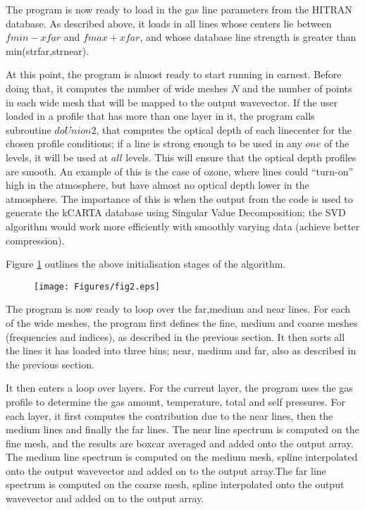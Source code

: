 \documentclass[11pt]{article}
\begin{document}
The program is now ready to load in the gas line parameters from the HITRAN
database. As described above, it loads in all lines whose centers lie 
between $fmin - xfar$ and $fmax + xfar$, and whose database line strength 
is greater than min(strfar,strnear). 

At this point, the program is almost ready to start running in earnest. 
Before doing that, it computes the number of wide meshes $N$ and the number 
of points in each wide mesh that will be mapped to the output wavevector.
If the user loaded in a profile that has more than one layer in it, 
the program calls subroutine $doUnion2$, that
computes the optical depth of each linecenter for the chosen profile 
conditions; if a line is strong enough to be used in any $one$ of the 
levels, it will be used at $all$ levels. This will ensure that the optical 
depth profiles are smooth. An example of this is the case of ozone, where 
lines could ``turn-on'' high in the atmosphere, but have almost no optical 
depth lower in the atmosphere. The importance of this is when the output 
from the code is used to generate the kCARTA database using Singular Value 
Decomposition; the SVD algorithm would work more efficiently with smoothly 
varying data (achieve better compression).

Figure \ref{fig:init_alg} outlines the above initialisation stages of the 
algorithm.

\begin{figure}[h]
  \begin{center}\texttt{[image: Figures/fig2.eps]}\end{center}
  \caption[Outline of initialization algorithm]{}
  \label{fig:init_alg}
\end{figure}

The program is now ready to loop over the far,medium and near lines. 
For each of the wide meshes, the program first defines the fine, medium and
coarse meshes (frequencies and indices), as described in the previous 
section. It then sorts all the lines it has loaded into three bins; near,
medium and far, also as described in the previous section.

It then enters a loop over layers. For the current layer, the program uses 
the gas profile to determine the gas amount, temperature, total and self 
pressures. For each layer, it first computes the contribution due to the 
near lines, then the medium lines and finally the far lines. The near line 
spectrum is computed
on the fine mesh, and the results are boxcar averaged and added onto the
output array. The medium line spectrum is computed on the medium mesh, 
spline interpolated onto the output wavevector and added on to the output 
array.The far line spectrum is computed on the coarse mesh, spline 
interpolated onto the output wavevector and added on to the output array.
\end{document}
